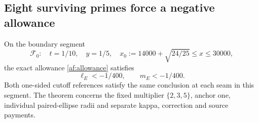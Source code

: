 \subsection{Eight surviving primes force a negative allowance}

\begin{theorem}
On the boundary segment
\begin{equation}
 \mathcal F_0:\quad t=1/10,\quad y=1/5,\quad
 x_0:=14000+\sqrt{24/25}\le x\le30000,
 \label{af:segment}
\end{equation}
the exact allowance \eqref{af:allowance} satisfies
\begin{equation}
 \boxed{\ell_E<-1/400,\qquad m_E<-1/400.}
 \label{af:negative}
\end{equation}
Both one-sided cutoff references satisfy the same conclusion at each
seam in this segment. The theorem concerns the fixed multiplier
$\{2,3,5\}$, anchor one, individual paired-ellipse radii and separate
kappa, correction and source payments.
\end{theorem}

